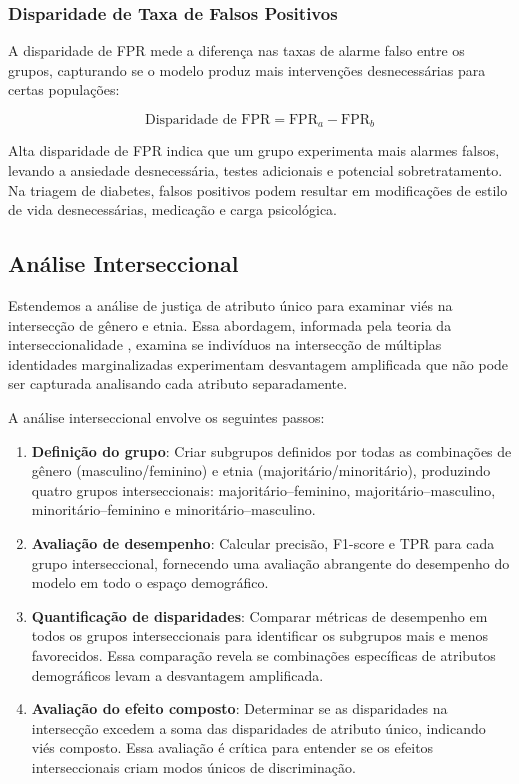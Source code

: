 \subsubsection{Disparidade de Taxa de Falsos Positivos}

A disparidade de FPR mede a diferença nas taxas de alarme falso entre 
os grupos, capturando se o modelo produz mais intervenções desnecessárias 
para certas populações:

\begin{equation}
\text{Disparidade de FPR} = \text{FPR}_a - \text{FPR}_b
\label{eq:fpr_disparity}
\end{equation}

Alta disparidade de FPR indica que um grupo experimenta mais alarmes 
falsos, levando a ansiedade desnecessária, testes adicionais e potencial 
sobretratamento. Na triagem de diabetes, falsos positivos podem resultar 
em modificações de estilo de vida desnecessárias, medicação e carga 
psicológica.

\subsection{Análise Interseccional}

Estendemos a análise de justiça de atributo único para examinar viés na 
intersecção de gênero e etnia. Essa abordagem, informada pela teoria da 
interseccionalidade \cite{crenshaw1989}, examina se indivíduos na 
intersecção de múltiplas identidades marginalizadas experimentam 
desvantagem amplificada que não pode ser capturada analisando cada atributo 
separadamente.

A análise interseccional envolve os seguintes passos:

\begin{enumerate}[leftmargin=*]
    \item \textbf{Definição do grupo}: Criar subgrupos definidos por todas 
          as combinações de gênero (masculino/feminino) e etnia 
          (majoritário/minoritário), produzindo quatro grupos 
          interseccionais: majoritário--feminino, majoritário--masculino, 
          minoritário--feminino e minoritário--masculino.
    \item \textbf{Avaliação de desempenho}: Calcular precisão, F1-score e 
          TPR para cada grupo interseccional, fornecendo uma avaliação 
          abrangente do desempenho do modelo em todo o espaço demográfico.
    \item \textbf{Quantificação de disparidades}: Comparar métricas de 
          desempenho em todos os grupos interseccionais para identificar 
          os subgrupos mais e menos favorecidos. Essa comparação revela 
          se combinações específicas de atributos demográficos levam a 
          desvantagem amplificada.
    \item \textbf{Avaliação do efeito composto}: Determinar se as 
          disparidades na intersecção excedem a soma das disparidades de 
          atributo único, indicando viés composto. Essa avaliação é crítica 
          para entender se os efeitos interseccionais criam modos únicos 
          de discriminação.
\end{enumerate}

